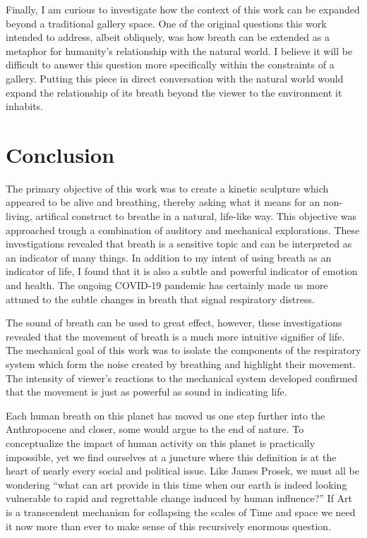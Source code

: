 \documentclass[letterpaper]{article}
\begin{document}
Finally, I am curious to investigate how the context of this work can be expanded beyond a traditional gallery space. One of the original questions this work intended to address, albeit obliquely, was how breath can be extended as a metaphor for humanity's relationship with the natural world. I believe it will be difficult to answer this question more specifically within the constraints of a gallery. Putting this piece in direct conversation with the natural world would expand the relationship of its breath beyond the viewer to the environment it inhabits. 


\section{Conclusion}


The primary objective of this work was to create a kinetic sculpture which appeared to be alive and breathing, thereby asking what it means for an non-living, artifical construct to breathe in a natural, life-like way. This objective was approached trough a combination of auditory and mechanical explorations. These investigations revealed that breath is a sensitive topic and can be interpreted as an indicator of many things. In addition to my intent of using breath as an indicator of life, I found that it is also a subtle and powerful indicator of emotion and health. The ongoing COVID-19 pandemic has certainly made us more attuned to the subtle changes in breath that signal respiratory distress.

The sound of breath can be used to great effect, however, these investigations revealed that the movement of breath is a much more intuitive signifier of life. The mechanical goal of this work was to isolate the components of the respiratory system which form the noise created by breathing and highlight their movement. The intensity of viewer's reactions to the mechanical system developed confirmed that the movement is just as powerful as sound in indicating life. 


Each human breath on this planet has moved us one step further into the Anthropocene and closer, some would argue to the end of nature. To conceptualize the impact of human activity on this planet is practically impossible, yet we find ourselves at a juncture where this definition is at the heart of nearly every social and political issue. Like James Prosek, we must all be wondering ``what can art provide in this time when our earth is indeed looking vulnerable to rapid and regrettable change induced by human influence?''\cite{prosek} If Art is a transcendent mechanism for collapsing the scales of Time and space we need it now more than ever to make sense of this recursively enormous question.
\end{document}
